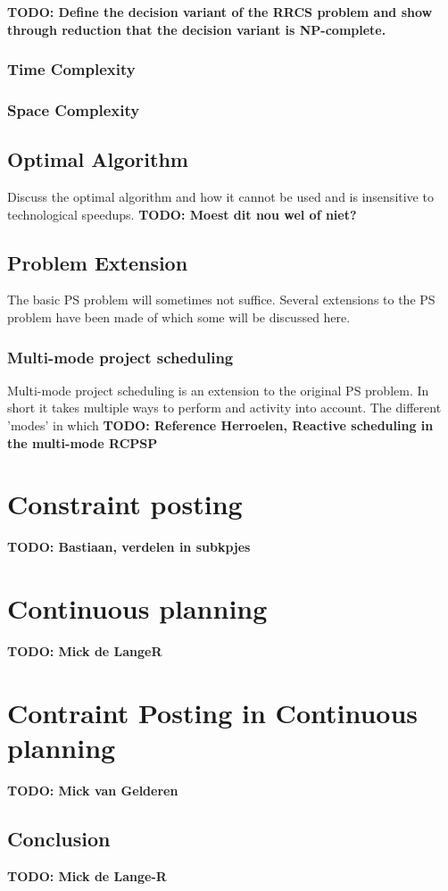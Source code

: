 \documentclass{article}
\newcommand{\TODO}[1]{{\color{red}\textbf{TODO: #1}}}
\begin{document}
\TODO{Define the decision variant of the RRCS problem and show through reduction that the decision variant is NP-complete.}
\subsubsection{Time Complexity}
\subsubsection{Space Complexity}

\subsection{Optimal Algorithm}
Discuss the optimal algorithm and how it cannot be used and is insensitive to technological speedups.
\TODO{Moest dit nou wel of niet?}

\subsection{Problem Extension}
The basic PS problem will sometimes not suffice. Several extensions to the PS problem have been made of which some will be discussed here. 

\subsubsection{Multi-mode project scheduling}
Multi-mode project scheduling is an extension to the original PS problem. In short it takes multiple ways to perform and activity into account. The different 'modes' in which
\TODO{Reference Herroelen, Reactive scheduling in the multi-mode RCPSP}

\section{Constraint posting}
\TODO{Bastiaan, verdelen in subkpjes}

\section{Continuous planning}
\TODO{Mick de LangeR}

\section{Contraint Posting in Continuous planning}
\TODO{Mick van Gelderen}

\subsection{Conclusion}
\TODO{Mick de Lange-R}
\end{document}
